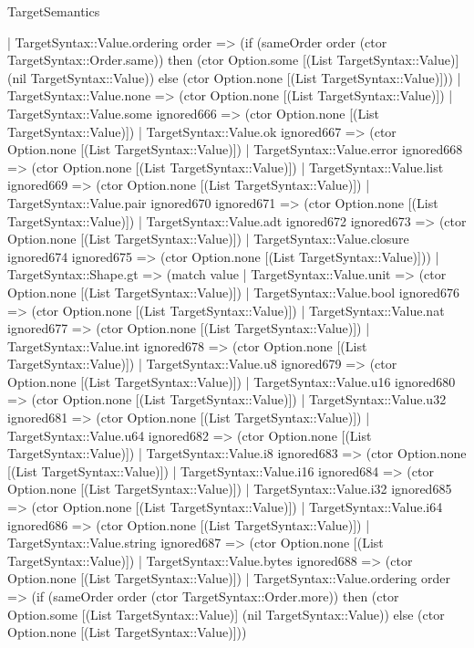 \begin{lexlean}{TargetSemantics}
\begin{semanticmodule}
{      | TargetSyntax::Value.ordering order => (if (sameOrder order (ctor TargetSyntax::Order.same)) then (ctor Option.some [(List TargetSyntax::Value)] (nil TargetSyntax::Value)) else (ctor Option.none [(List TargetSyntax::Value)]))
      | TargetSyntax::Value.none => (ctor Option.none [(List TargetSyntax::Value)])
      | TargetSyntax::Value.some ignored666 => (ctor Option.none [(List TargetSyntax::Value)])
      | TargetSyntax::Value.ok ignored667 => (ctor Option.none [(List TargetSyntax::Value)])
      | TargetSyntax::Value.error ignored668 => (ctor Option.none [(List TargetSyntax::Value)])
      | TargetSyntax::Value.list ignored669 => (ctor Option.none [(List TargetSyntax::Value)])
      | TargetSyntax::Value.pair ignored670 ignored671 => (ctor Option.none [(List TargetSyntax::Value)])
      | TargetSyntax::Value.adt ignored672 ignored673 => (ctor Option.none [(List TargetSyntax::Value)])
      | TargetSyntax::Value.closure ignored674 ignored675 => (ctor Option.none [(List TargetSyntax::Value)]))
    | TargetSyntax::Shape.gt => (match value
      | TargetSyntax::Value.unit => (ctor Option.none [(List TargetSyntax::Value)])
      | TargetSyntax::Value.bool ignored676 => (ctor Option.none [(List TargetSyntax::Value)])
      | TargetSyntax::Value.nat ignored677 => (ctor Option.none [(List TargetSyntax::Value)])
      | TargetSyntax::Value.int ignored678 => (ctor Option.none [(List TargetSyntax::Value)])
      | TargetSyntax::Value.u8 ignored679 => (ctor Option.none [(List TargetSyntax::Value)])
      | TargetSyntax::Value.u16 ignored680 => (ctor Option.none [(List TargetSyntax::Value)])
      | TargetSyntax::Value.u32 ignored681 => (ctor Option.none [(List TargetSyntax::Value)])
      | TargetSyntax::Value.u64 ignored682 => (ctor Option.none [(List TargetSyntax::Value)])
      | TargetSyntax::Value.i8 ignored683 => (ctor Option.none [(List TargetSyntax::Value)])
      | TargetSyntax::Value.i16 ignored684 => (ctor Option.none [(List TargetSyntax::Value)])
      | TargetSyntax::Value.i32 ignored685 => (ctor Option.none [(List TargetSyntax::Value)])
      | TargetSyntax::Value.i64 ignored686 => (ctor Option.none [(List TargetSyntax::Value)])
      | TargetSyntax::Value.string ignored687 => (ctor Option.none [(List TargetSyntax::Value)])
      | TargetSyntax::Value.bytes ignored688 => (ctor Option.none [(List TargetSyntax::Value)])
      | TargetSyntax::Value.ordering order => (if (sameOrder order (ctor TargetSyntax::Order.more)) then (ctor Option.some [(List TargetSyntax::Value)] (nil TargetSyntax::Value)) else (ctor Option.none [(List TargetSyntax::Value)]))
}
\end{semanticmodule}
\end{lexlean}
